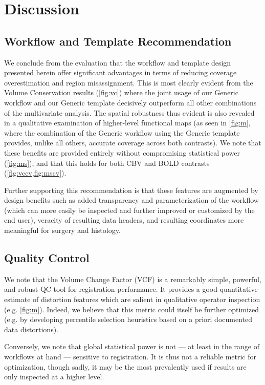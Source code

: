 \section{Discussion}
\subsection{Workflow and Template Recommendation}

We conclude from the evaluation that the workflow and template design presented herein offer significant advantages in terms of reducing coverage overestimation and region misassignment.
This is most clearly evident from the Volume Conservation results (\cref{fig:vc}) where the joint usage of our Generic workflow and our Generic template decisively outperform all other combinations of the multivariate analysis.
The spatial robustness thus evident is also revealed in a qualitative examination of higher-level functional maps (as seen in \cref{fig:m}, where the combination of the Generic workflow using the Generic template provides, unlike all others, accurate coverage across both contrasts).
We note that these benefits are provided entirely without compromising statistical power (\cref{fig:ms}), and that this holds for both CBV and BOLD contrasts (\cref{fig:vccv,fig:mscv}).

Further supporting this recommendation is that these features are augmented by design benefits such as added transparency and parameterization of the workflow (which can more easily be inspected and further improved or customized by the end user), veracity of resulting data headers, and resulting coordinates more meaningful for surgery and histology.

\subsection{Quality Control}

We note that the Volume Change Factor (VCF) is a remarkably simple, powerful, and robust QC tool for registration performance.
It provides a good quantitative estimate of distortion features which are salient in qualitative operator inspection (e.g. \cref{fig:m}).
Indeed, we believe that this metric could itself be further optimized (e.g. by developing percentile selection heuristics based on a priori documented data distortions).

Conversely, we note that global statistical power is not --- at least in the range of workflows at hand --- sensitive to registration.
It is thus not a reliable metric for optimization, though sadly, it may be the most prevalently used if results are only inspected at a higher level.

